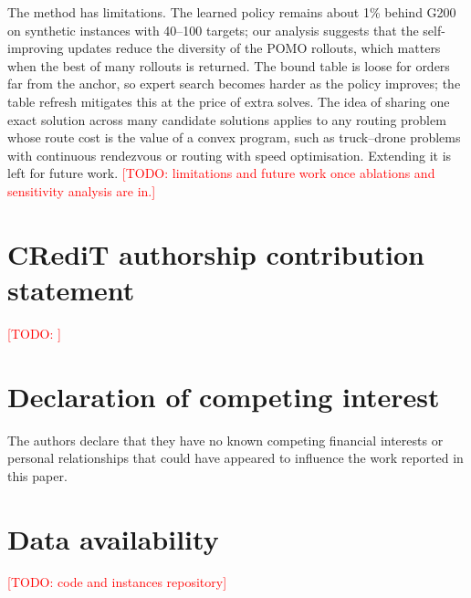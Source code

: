 \documentclass[preprint,review,12pt,authoryear]{elsarticle}
\newcommand{\todo}[1]{\textcolor{red}{[TODO: #1]}}
\begin{document}
The method has limitations. The learned policy remains about 1\% behind G200 on synthetic instances with
40--100 targets; our analysis suggests that the self-improving updates reduce the diversity of the POMO
rollouts, which matters when the best of many rollouts is returned. The bound table is loose for orders
far from the anchor, so expert search becomes harder as the policy improves; the table refresh mitigates this
at the price of extra solves. The idea of sharing one exact solution across many candidate solutions applies
to any routing problem whose route cost is the value of a convex program, such as truck--drone problems with
continuous rendezvous or routing with speed optimisation. Extending it is left for future work.
\todo{limitations and future work once ablations and sensitivity analysis are in.}

\section*{CRediT authorship contribution statement}
\todo{}
\section*{Declaration of competing interest}
The authors declare that they have no known competing financial interests or personal relationships
that could have appeared to influence the work reported in this paper.
\section*{Data availability}
\todo{code and instances repository}




\appendix
\end{document}
